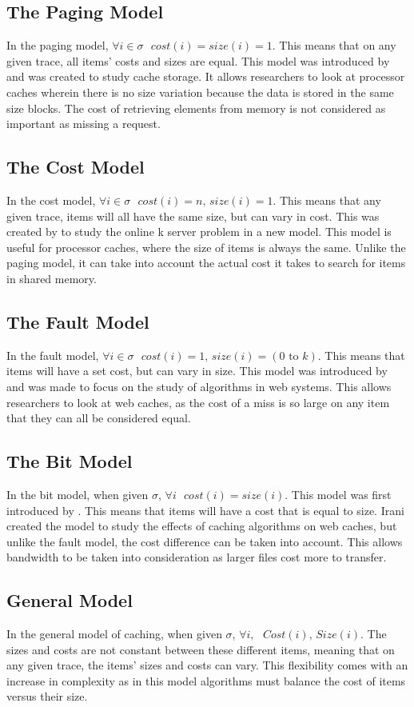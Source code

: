  
\subsection{The Paging Model}
In the paging model, $\forall i \in \sigma  \text{ }cost(i) =  size(i)=1$. This means that on any given trace, all items' costs and sizes are equal. This model was introduced by \cite{sleator1985amortized} and was created to study cache storage. It allows researchers to look at processor caches wherein there is no size variation because the data is stored in the same size blocks. The cost of retrieving elements from memory is not considered as important as missing a request. 

\subsection{The Cost Model}
In the cost model, $\forall i \in \sigma \text{ } cost(i) =n \text{, } size(i)=1$. This means that any given trace, items will all have the same size, but can vary in cost. This was created by \cite{young1994k} to study the online k server problem in a new model. This model is useful for processor caches, where the size of items is always the same. Unlike the paging model, it can take into account the actual cost it takes to search for items in shared memory.


\subsection{The Fault Model}
In the fault model, $\forall i \in \sigma \text{ } cost(i) = 1\text{, } size(i)=(0\text{ to }k)$. This means that items will have a set cost, but can vary in size. This model was introduced by \cite{irani1997page} and was made to focus on the study of algorithms in web systems. This allows researchers to look at web caches, as the cost of a miss is so large on any item that they can all be considered equal.

\subsection{The Bit Model}
In the bit model, when given $\sigma$, $\forall i \text{ }cost(i)=size(i)$. This model was first introduced by \cite{irani1997page}. This means that items will have a cost that is equal to size. Irani created the model to study the effects of caching algorithms on web caches, but unlike the fault model, the cost difference can be taken into account. This allows bandwidth to be taken into consideration as larger files cost more to transfer.


\subsection{General Model}
In the general model of caching, when given $\sigma$, $\forall i, \textbf{ }  Cost(i) \text{, } Size(i)$. The sizes and costs are not constant between these different items, meaning that on any given trace, the items' sizes and costs can vary. This flexibility comes with an increase in complexity as in this model algorithms must balance the cost of items versus their size.